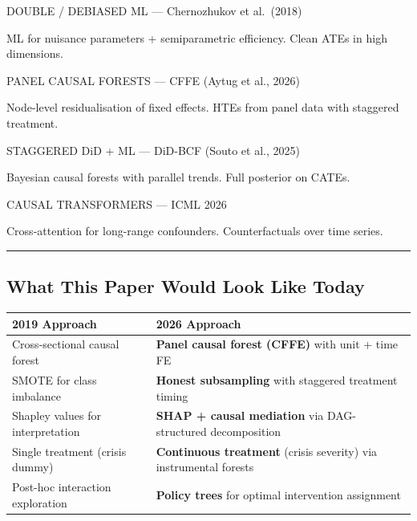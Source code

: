 \documentclass[
  letterpaper,
  DIV=11,
  numbers=noendperiod]{scrartcl}
\begin{document}
{DOUBLE / DEBIASED ML} --- Chernozhukov et al.~(2018)

ML for nuisance parameters + semiparametric efficiency. Clean ATEs in
high dimensions.

{PANEL CAUSAL FORESTS} --- CFFE (Aytug et al., 2026)

Node-level residualisation of fixed effects. HTEs from panel data with
staggered treatment.

{STAGGERED DiD + ML} --- DiD-BCF (Souto et al., 2025)

Bayesian causal forests with parallel trends. Full posterior on CATEs.

{CAUSAL TRANSFORMERS} --- ICML 2026

Cross-attention for long-range confounders. Counterfactuals over time
series.

\begin{center}\rule{0.5\linewidth}{0.5pt}\end{center}

\subsection{What This Paper Would Look Like
Today}\label{what-this-paper-would-look-like-today}

\begin{longtable}[]{@{}
  >{\raggedright\arraybackslash}p{}
  >{\raggedright\arraybackslash}p{}@{}}
\toprule\noalign{}
\begin{minipage}[b]{\linewidth}\raggedright
2019 Approach
\end{minipage} & \begin{minipage}[b]{\linewidth}\raggedright
2026 Approach
\end{minipage} \\
\midrule\noalign{}
\endhead
\bottomrule\noalign{}
\endlastfoot
Cross-sectional causal forest & \textbf{Panel causal forest (CFFE)} with
unit + time FE \\
SMOTE for class imbalance & \textbf{Honest subsampling} with staggered
treatment timing \\
Shapley values for interpretation & \textbf{SHAP + causal mediation} via
DAG-structured decomposition \\
Single treatment (crisis dummy) & \textbf{Continuous treatment} (crisis
severity) via instrumental forests \\
Post-hoc interaction exploration & \textbf{Policy trees} for optimal
intervention assignment \\
\end{longtable}
\end{document}
